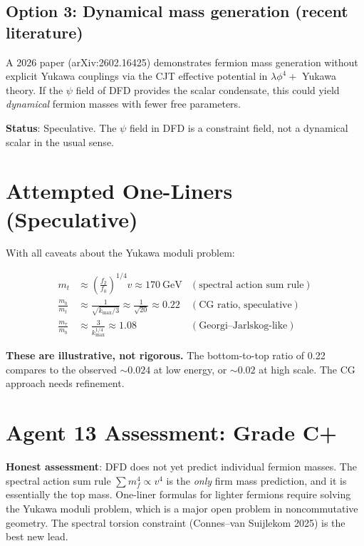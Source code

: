 \documentclass[11pt,a4paper]{article}
\begin{document}
\subsection{Option 3: Dynamical mass generation (recent literature)}

A 2026 paper (arXiv:2602.16425) demonstrates fermion mass generation without explicit Yukawa couplings via the CJT effective potential in $\lambda\phi^4 + $ Yukawa theory. If the $\psi$ field of DFD provides the scalar condensate, this could yield \emph{dynamical} fermion masses with fewer free parameters.

\textbf{Status}: Speculative. The $\psi$ field in DFD is a constraint field, not a dynamical scalar in the usual sense.

\section{Attempted One-Liners (Speculative)}

With all caveats about the Yukawa moduli problem:

\begin{align}
m_t &\approx \left(\frac{f_2}{f_0}\right)^{1/4} v \approx 170~\text{GeV} & (\text{spectral action sum rule}) \\
\frac{m_b}{m_t} &\approx \frac{1}{\sqrt{k_{\max}/3}} \approx \frac{1}{\sqrt{20}} \approx 0.22 & (\text{CG ratio, speculative}) \\
\frac{m_\tau}{m_b} &\approx \frac{3}{k_{\max}^{1/4}} \approx 1.08 & (\text{Georgi--Jarlskog-like})
\end{align}

\textbf{These are illustrative, not rigorous.} The bottom-to-top ratio of 0.22 compares to the observed $\sim 0.024$ at low energy, or $\sim 0.02$ at high scale. The CG approach needs refinement.

\section{Agent 13 Assessment: Grade C+}

\textbf{Honest assessment}: DFD does not yet predict individual fermion masses. The spectral action sum rule $\sum m_f^4 \propto v^4$ is the \emph{only} firm mass prediction, and it is essentially the top mass. One-liner formulas for lighter fermions require solving the Yukawa moduli problem, which is a major open problem in noncommutative geometry. The spectral torsion constraint (Connes--van Suijlekom 2025) is the best new lead.
\end{document}
